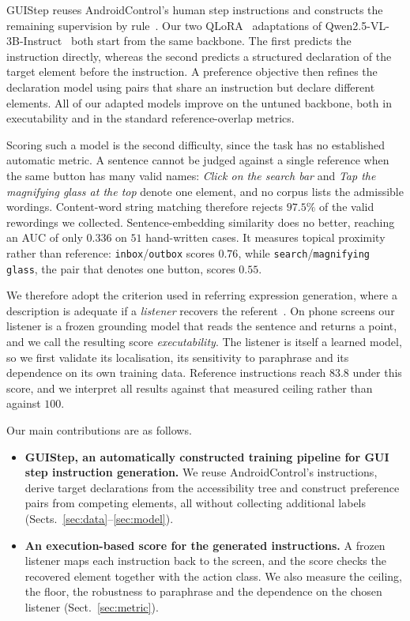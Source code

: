 \documentclass[runningheads,a4paper]{llncs}
\begin{document}
GUIStep reuses AndroidControl's human step instructions and constructs the remaining supervision
by rule~\cite{androidcontrol}. Our two QLoRA~\cite{qlora} adaptations of
Qwen2.5-VL-3B-Instruct~\cite{qwen25vl} both start from the same backbone. The first predicts the
instruction directly, whereas the second predicts a structured declaration of the target element
before the instruction. A preference objective then refines the declaration model using pairs
that share an instruction but declare different elements. All of our adapted models improve on
the untuned backbone, both in executability and in the standard reference-overlap metrics.

Scoring such a model is the second difficulty, since the task has no established automatic
metric. A sentence cannot be judged against a single reference when the same button has many
valid names: \emph{Click on the search bar} and \emph{Tap the magnifying glass at the top} denote
one element, and no corpus lists the admissible wordings. Content-word string matching therefore
rejects $97.5\%$ of the valid rewordings we collected. Sentence-embedding similarity does no
better, reaching an AUC of only $0.336$ on $51$ hand-written cases. It measures topical
proximity rather than reference: \texttt{inbox}/\texttt{outbox} scores $0.76$, while
\texttt{search}/\texttt{magnifying glass}, the pair that denotes one button, scores $0.55$.

We therefore adopt the criterion used in referring expression generation, where a description is
adequate if a \emph{listener} recovers the referent~\cite{mao2016,luo2017,yu2016}. On phone
screens our listener is a frozen grounding model that reads the sentence and returns a point, and
we call the resulting score \emph{executability}. The listener is itself a learned model, so we
first validate its localisation, its sensitivity to paraphrase and its dependence on its own
training data. Reference instructions reach $83.8$ under this score, and we interpret all
results against that measured ceiling rather than against $100$.

Our main contributions are as follows.
\begin{itemize}
\item \textbf{GUIStep, an automatically constructed training pipeline for GUI step instruction
generation.} We reuse AndroidControl's instructions, derive target declarations from the
accessibility tree and construct preference pairs from competing elements, all without collecting
additional labels (Sects.~\ref{sec:data}--\ref{sec:model}).
\item \textbf{An execution-based score for the generated instructions.} A frozen listener maps
each instruction back to the screen, and the score checks the recovered element together with the
action class. We also measure the ceiling, the floor, the robustness to paraphrase and the
dependence on the chosen listener (Sect.~\ref{sec:metric}).
\end{itemize}
\end{document}
